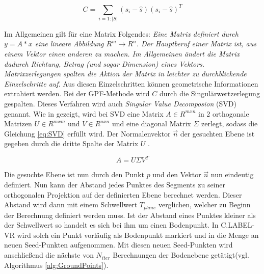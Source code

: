 \begin{equation} 
C=\sum_{i=1:\vert S\vert }(s_{i}-\hat{s})(s_{i}-\hat{s})^{T}
\label{eq:Covar} 
\end{equation}

Im Allgemeinen gilt für eine Matrix Folgendes: \glqq \textit{Eine Matrix definiert durch $y=A*x$ eine lineare Abbildung $R^m \to R^n$. Der Hauptberuf einer Matrix ist, aus einem Vektor einen anderen zu machen. Im Allgemeinen ändert die Matrix dadurch Richtung, Betrag (und sogar
Dimension) eines Vektors. Matrixzerlegungen spalten die Aktion der Matrix in leichter zu durchblickende Einzelschritte auf}\grqq \cite{bib:Decomposion}. Aus diesen Einzelschritten können geometrische Informationen extrahiert werden. Bei der GPF-Methode wird $C$ durch die Singulärwertzerlegung gespalten. Dieses Verfahren wird auch \textit{Singular Value Decomposion} (SVD) genannt. Wie in \cite{bib:SVD} gezeigt, wird bei SVD eine Matrix $A \in R^{mxn}$ in 2 orthogonale Matrizen $U \in R^{mxm}$ und $V\in R^{nxn}$ und eine diagonal Matrix $\Sigma$ zerlegt, sodass die Gleichung \ref{eq:SVD} erfüllt wird. Der Normalenvektor $\vec{n}$ der gesuchten Ebene ist gegeben durch die dritte Spalte der Matrix $U$ \cite{bib:SVDforFitting}.

\begin{equation} 
A=U \Sigma V^T
\label{eq:SVD}
\end{equation}


Die gesuchte Ebene ist nun durch den Punkt $p$ und den Vektor $\vec{n}$ nun eindeutig definiert. Nun kann der Abstand jedes Punktes des Segments zu seiner orthogonalen Projektion auf der definierten Ebene berechnet werden. Dieser Abstand wird dann mit einem Schwellwert $T_{plane}$ verglichen, welcher zu Beginn der Berechnung definiert werden muss. Ist der Abstand eines Punktes kleiner als der Schwellwert so handelt es sich bei ihm um einen Bodenpunkt. In C.LABEL-VR wird solch ein Punkt vorläufig als Bodenpunkt markiert und in die Menge an neuen Seed-Punkten aufgenommen. Mit diesen neuen Seed-Punkten wird anschließend die nächste von $N_{iter}$ Berechnungen der Bodenebene getätigt(vgl. Algorithmus \ref{alg:GroundPoints}).

